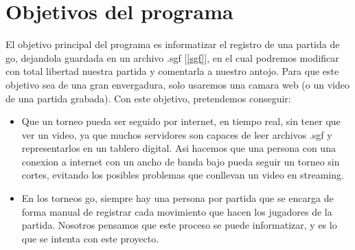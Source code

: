 \documentclass[12pt,a4paper]{report}
\begin{document}
\section{Objetivos del programa}
El objetivo principal del programa es informatizar el registro de una partida de go, dejandola guardada en un archivo .sgf [\ref{sgf}], en el cual podremos modificar con total libertad nuestra partida y comentarla a nuestro antojo. Para que este objetivo sea de una gran envergadura, solo usaremos una camara web (o un video de una partida grabada). Con este objetivo, pretendemos conseguir:
\begin{itemize}
\item Que un torneo pueda ser seguido por internet, en tiempo real, sin tener que ver un video, ya que muchos servidores son capaces de leer archivos .sgf y representarlos en un tablero digital. Asi hacemos que una persona con una conexion a internet con un ancho de banda bajo pueda seguir un torneo sin cortes, evitando los posibles problemas que conllevan un video en streaming.
\item En los torneos go, siempre hay una persona por partida que se encarga de forma manual de registrar cada movimiento que hacen los jugadores de la partida. Nosotros pensamos que este proceso se puede informatizar, y es lo que se intenta con este proyecto.
\end{itemize}
\end{document}
